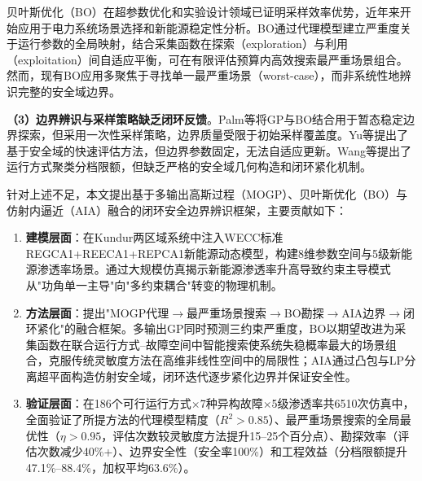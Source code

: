贝叶斯优化（BO）在超参数优化\cite{snoek2012practical}和实验设计领域已证明采样效率优势，近年来开始应用于电力系统场景选择\cite{bo2025der_scenarios, han2018surrogate_var}和新能源稳定性分析\cite{liu2020bayesian_security}。BO通过代理模型建立严重度关于运行参数的全局映射，结合采集函数在探索（exploration）与利用（exploitation）间自适应平衡，可在有限评估预算内高效搜索最严重场景组合\cite{frazier2018bo_tutorial}。然而，现有BO应用多聚焦于寻找单一最严重场景（worst-case），而非系统性地辨识完整的安全域边界。

\textbf{（3）边界辨识与采样策略缺乏闭环反馈}。Palm等\cite{palm2022gp_bo}将GP与BO结合用于暂态稳定边界探索，但采用一次性采样策略，边界质量受限于初始采样覆盖度。Yu等\cite{yu2020security_region}提出了基于安全域的快速评估方法，但边界参数固定，无法自适应更新。Wang等\cite{wang2021sparse_pce}提出了运行方式聚类分档限额，但缺乏严格的安全域几何构造和闭环紧化机制。

针对上述不足，本文提出基于多输出高斯过程（MOGP）、贝叶斯优化（BO）与仿射内逼近（AIA）融合的闭环安全边界辨识框架，主要贡献如下：

\begin{enumerate}
    \item \textbf{建模层面}：在Kundur两区域系统中注入WECC标准REGCA1+REECA1+REPCA1新能源动态模型，构建8维参数空间与5级新能源渗透率场景。通过大规模仿真揭示新能源渗透率升高导致约束主导模式从"功角单一主导"向"多约束耦合"转变的物理机制。

    \item \textbf{方法层面}：提出"MOGP代理$\to$最严重场景搜索$\to$BO勘探$\to$AIA边界$\to$闭环紧化"的融合框架。多输出GP同时预测三约束严重度，BO以期望改进为采集函数在联合运行方式--故障空间中智能搜索使系统失稳概率最大的场景组合，克服传统灵敏度方法在高维非线性空间中的局限性；AIA通过凸包与LP分离超平面构造仿射安全域，闭环迭代逐步紧化边界并保证安全性。

    \item \textbf{验证层面}：在186个可行运行方式$\times$7种异构故障$\times$5级渗透率共6510次仿真中，全面验证了所提方法的代理模型精度（$R^2 > 0.85$）、最严重场景搜索的全局最优性（$\eta > 0.95$，评估次数较灵敏度方法提升15--25个百分点）、勘探效率（评估次数减少40\%+）、边界安全性（安全率100\%）和工程效益（分档限额提升47.1\%--88.4\%，加权平均63.6\%）。
\end{enumerate}
